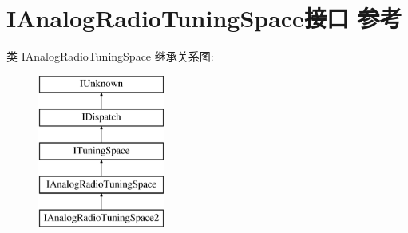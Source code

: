 \hypertarget{interface_i_analog_radio_tuning_space}{}\section{I\+Analog\+Radio\+Tuning\+Space接口 参考}
\label{interface_i_analog_radio_tuning_space}
类 I\+Analog\+Radio\+Tuning\+Space 继承关系图\+:\begin{figure}[H]
\begin{center}
\leavevmode
\includegraphics[height=5.000000cm]{interface_i_analog_radio_tuning_space}
\end{center}
\end{figure}
